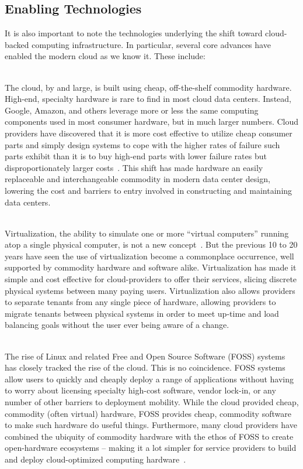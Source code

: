 \subsection{Enabling Technologies}

It is also important to note the technologies underlying the shift
toward cloud-backed computing infrastructure. In particular, several
core advances have enabled the modern cloud as we know it. These
include:

\begin{packed_desc}
\item[Commoditization of Hardware] \hfill \\ The cloud, by and large,
  is built using cheap, off-the-shelf commodity hardware. High-end,
  specialty hardware is rare to find in most cloud data
  centers. Instead, Google, Amazon, and others leverage more or less
  the same computing components used in most consumer hardware, but in
  much larger numbers. Cloud providers have discovered that it is more
  cost effective to utilize cheap consumer parts and simply design
  systems to cope with the higher rates of failure such parts exhibit
  than it is to buy high-end parts with lower failure rates but
  disproportionately larger costs~\cite{atwood2007}. This shift has
  made hardware an easily replaceable and interchangeable commodity in
  modern data center design, lowering the cost and barriers to entry
  involved in constructing and maintaining data centers.
\item[Virtualization] \hfill \\ Virtualization, the ability to
  simulate one or more ``virtual computers'' running atop a single
  physical computer, is not a new concept~\cite{goldberg1974}. But the
  previous 10 to 20 years have seen the use of virtualization become a
  commonplace occurrence, well supported by commodity hardware and
  software alike. Virtualization has made it simple and cost effective
  for cloud-providers to offer their services, slicing discrete
  physical systems between many paying users. Virtualization also
  allows providers to separate tenants from any single piece of
  hardware, allowing providers to migrate tenants between physical
  systems in order to meet up-time and load balancing goals without
  the user ever being aware of a change.
\item[Free and Open Source Software (and Hardware)] \hfill \\ The rise
  of Linux and related Free and Open Source Software (FOSS) systems
  has closely tracked the rise of the cloud. This is no
  coincidence. FOSS systems allow users to quickly and cheaply deploy
  a range of applications without having to worry about licensing
  specialty high-cost software, vendor lock-in, or any number of other
  barriers to deployment mobility. While the cloud provided cheap,
  commodity (often virtual) hardware, FOSS provides cheap, commodity
  software to make such hardware do useful things. Furthermore, many
  cloud providers have combined the ubiquity of commodity hardware
  with the ethos of FOSS to create open-hardware ecosystems -- making
  it a lot simpler for service providers to build and deploy
  cloud-optimized computing hardware~\cite{opencompute}.
\end{packed_desc}

